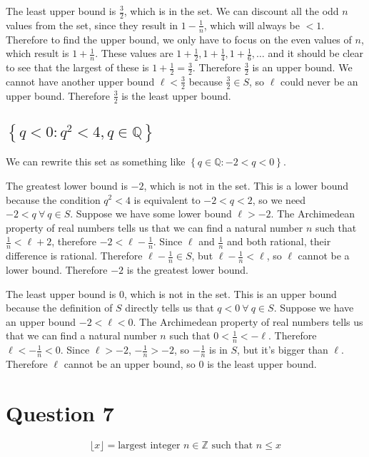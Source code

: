 \documentclass[a4paper]{article}
\begin{document}
The least upper bound is $\frac32$, which is in the set. We can discount all the odd $n$ values from the set, since they result in $1 - \frac1n$, which will always be $< 1$. Therefore to find the upper bound, we only have to focus on the even values of $n$, which result is $1 + \frac1n$. These values are $1 + \frac12, 1 + \frac14, 1 + \frac16, \ldots$ and it should be clear to see that the largest of these is $1 + \frac12 = \frac32$. Therefore $\frac32$ is an upper bound. We cannot have another upper bound $\ell < \frac32$ because $\frac32 \in S$, so $\ell$ could never be an upper bound. Therefore $\frac32$ is the least upper bound.

\subsection{$\left\{ q < 0 : q^2 < 4, q \in \mathbb{Q} \right\}$}

We can rewrite this set as something like $\left\{ q \in \mathbb Q : -2 < q < 0 \right\}$.

The greatest lower bound is $-2$, which is not in the set. This is a lower bound because the condition $q^2 < 4$ is equivalent to $-2 < q < 2$, so we need $-2 < q\ \forall\ q \in S$. Suppose we have some lower bound $\ell > -2$. The Archimedean property of real numbers tells us that we can find a natural number $n$ such that $\frac1n < \ell + 2$, therefore $-2 < \ell - \frac1n$. Since $\ell$ and $\frac1n$ and both rational, their difference is rational. Therefore $\ell - \frac1n \in S$, but $\ell - \frac1n < \ell$, so $\ell$ cannot be a lower bound. Therefore $-2$ is the greatest lower bound.

The least upper bound is $0$, which is not in the set. This is an upper bound because the definition of $S$ directly tells us that $q < 0\ \forall\ q \in S$. Suppose we have an upper bound $-2 < \ell < 0$. The Archimedean property of real numbers tells us that we can find a natural number $n$ such that $0 < \frac1n < -\ell$. Therefore $\ell < -\frac1n < 0$. Since $\ell > -2$, $-\frac1n > -2$, so $-\frac1n$ is in $S$, but it's bigger than $\ell$. Therefore $\ell$ cannot be an upper bound, so $0$ is the least upper bound.


\section*{Question 7}

$$\lfloor x \rfloor = \text{largest integer } n \in \mathbb Z \text{ such that } n \le x$$
\end{document}
